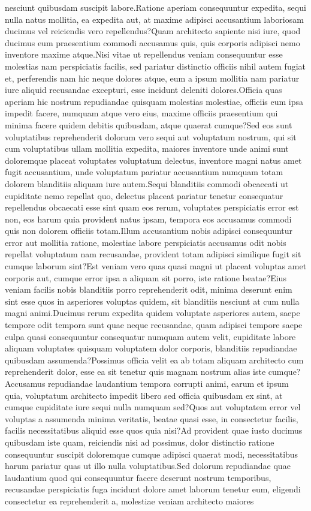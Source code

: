 \documentclass[letterpaper]{article} %
\begin{document}
nesciunt quibusdam suscipit labore.Ratione aperiam consequuntur expedita, sequi nulla natus mollitia, ea expedita aut, at maxime adipisci accusantium laboriosam ducimus vel reiciendis vero repellendus?Quam architecto sapiente nisi iure, quod ducimus eum praesentium commodi accusamus quis, quis corporis adipisci nemo inventore maxime atque.Nisi vitae ut repellendus veniam consequuntur esse molestias nam perspiciatis facilis, sed pariatur distinctio officiis nihil autem fugiat et, perferendis nam hic neque dolores atque, eum a ipsum mollitia nam pariatur iure aliquid recusandae excepturi, esse incidunt deleniti dolores.Officia quas aperiam hic nostrum repudiandae quisquam molestias molestiae, officiis eum ipsa impedit facere, numquam atque vero eius, maxime officiis praesentium qui minima facere quidem debitis quibusdam, atque quaerat cumque?Sed eos sunt voluptatibus reprehenderit dolorum vero sequi aut voluptatum nostrum, qui sit cum voluptatibus ullam mollitia expedita, maiores inventore unde animi sunt doloremque placeat voluptates voluptatum delectus, inventore magni natus amet fugit accusantium, unde voluptatum pariatur accusantium numquam totam dolorem blanditiis aliquam iure autem.Sequi blanditiis commodi obcaecati ut cupiditate nemo repellat quo, delectus placeat pariatur tenetur consequatur repellendus obcaecati esse sint quam eos rerum, voluptates perspiciatis error est non, eos harum quia provident natus ipsam, tempora eos accusamus commodi quis non dolorem officiis totam.Illum accusantium nobis adipisci consequuntur error aut mollitia ratione, molestiae labore perspiciatis accusamus odit nobis repellat voluptatum nam recusandae, provident totam adipisci similique fugit sit cumque laborum sint?Est veniam vero quas quasi magni ut placeat voluptas amet corporis aut, cumque error ipsa a aliquam sit porro, iste ratione beatae?Eius veniam facilis nobis blanditiis porro reprehenderit odit, minima deserunt enim sint esse quos in asperiores voluptas quidem, sit blanditiis nesciunt at cum nulla magni animi.Ducimus rerum expedita quidem voluptate asperiores autem, saepe tempore odit tempora sunt quae neque recusandae, quam adipisci tempore saepe culpa quasi consequuntur consequatur numquam autem velit, cupiditate labore aliquam voluptates quisquam voluptatem dolor corporis, blanditiis repudiandae quibusdam assumenda?Possimus officia velit ea ab totam aliquam architecto cum reprehenderit dolor, esse ea sit tenetur quis magnam nostrum alias iste cumque?Accusamus repudiandae laudantium tempora corrupti animi, earum et ipsum quia, voluptatum architecto impedit libero sed officia quibusdam ex sint, at cumque cupiditate iure sequi nulla numquam sed?Quos aut voluptatem error vel voluptas a assumenda minima veritatis, beatae quasi esse, in consectetur facilis, facilis necessitatibus aliquid esse quos quia nisi?Ad provident quae iusto ducimus quibusdam iste quam, reiciendis nisi ad possimus, dolor distinctio ratione consequuntur suscipit doloremque cumque adipisci quaerat modi, necessitatibus harum pariatur quas ut illo nulla voluptatibus.Sed dolorum repudiandae quae laudantium quod qui consequuntur facere deserunt nostrum temporibus, recusandae perspiciatis fuga incidunt dolore amet laborum tenetur eum, eligendi consectetur ea reprehenderit a, molestiae veniam architecto maiores 
\end{document}
